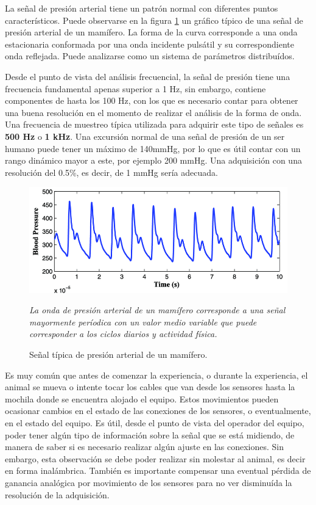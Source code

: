 La señal de presión arterial tiene un patrón normal con diferentes puntos característicos. Puede observarse en la figura \ref{fig:senpresion} un gráfico típico de una señal de presión arterial de un mamífero. La forma de la curva corresponde a una onda estacionaria conformada por una onda incidente pulsátil y su correspondiente onda reflejada. Puede analizarse como un sistema de parámetros distribuídos. 

Desde el punto de vista del análisis frecuencial, la señal de presión tiene una frecuencia fundamental apenas superior a 1 Hz, sin embargo, contiene componentes de hasta los 100 Hz, con los que es necesario contar para obtener una buena resolución en el momento de realizar el análisis de la forma de onda. Una frecuencia de muestreo típica utilizada para adquirir este tipo de señales es \textbf{500 Hz} o \textbf{1 kHz}. Una excursión normal de una señal de presión de un ser humano puede tener un máximo de 140mmHg, por lo que es útil contar con un rango dinámico mayor a este, por ejemplo 200 mmHg. Una adquisición con una resolución del 0.5\%, es decir, de 1 mmHg sería adecuada.

\begin{figure}[!htbp]
	\centering
	
	\begin{minipage}{0.65\textwidth}
		\includegraphics[width=\textwidth]{./Figures/senpresion.png}
		{\footnotesize \textit{La onda de presión arterial de un mamífero corresponde a una señal mayormente períodica con un valor medio variable que puede corresponder a los ciclos diarios y actividad física.}\par}		
	\end{minipage}		
	
	\caption{Señal típica de presión arterial de un mamífero.}
	\label{fig:senpresion}
\end{figure}

Es muy común que antes de comenzar la experiencia, o durante la experiencia, el animal se mueva o intente tocar los cables que van desde los sensores hasta la mochila donde se encuentra alojado el equipo. Estos movimientos pueden ocasionar cambios en el estado de las conexiones de los sensores, o eventualmente, en el estado del equipo. Es útil, desde el punto de vista del operador del equipo, poder tener algún tipo de información sobre la señal que se está midiendo, de manera de saber si es necesario realizar algún ajuste en las conexiones. Sin embargo, esta observación se debe poder realizar sin molestar al animal, es decir en forma inalámbrica. También es importante compensar una eventual pérdida de ganancia analógica por movimiento de los sensores para no ver disminuída la resolución de la adquisición. 

